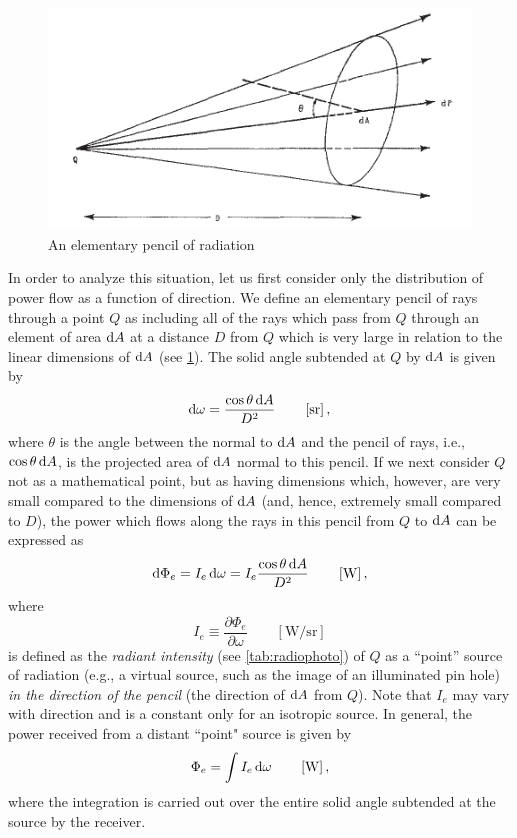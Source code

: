 \begin{refsection}
\begin{figure}
\begin{center}
\includegraphics{figures_built/nicodemus1963-fig1.pdf}
\end{center}
\caption{An elementary pencil of radiation}
\label{fig:nicodemus1}
\end{figure}

In order to analyze this situation, let us first consider only the distribution
of power flow as a function of direction. We define an elementary pencil of rays
through a point $Q$ as including all of the rays which pass from $Q$ through an
element of area $\mathop{}\!\mathrm{d} A$ at a distance $D$ from $Q$ which is very large in relation
to
the linear dimensions of $\mathop{}\!\mathrm{d} A$ (see \cref{fig:nicodemus1}).
The solid angle subtended at $Q$ by $\mathop{}\!\mathrm{d} A$ is given by
\begin{equation*}
\d\omega = \frac{\cos\theta \d A}{D^2}
\qquad \left[\unit{\steradian}\right],
\end{equation*}
where $\theta$ is the angle between the normal to $\mathop{}\!\mathrm{d} A$ and the pencil of rays,
i.e., $\cos\theta \mathop{}\!\mathrm{d} A$, is the projected area of $\mathop{}\!\mathrm{d} A$ normal to this pencil.
If we next consider $Q$ not as a mathematical point, but as having dimensions
which, however, are very small compared to the dimensions of $\mathop{}\!\mathrm{d} A$ (and, hence,
extremely small compared to $D$), the power which flows along the rays in this
pencil from $Q$ to $\mathop{}\!\mathrm{d} A$ can be expressed as
\begin{equation*}
\d\Phi_e = I_e \d\omega = I_e \frac{\cos\theta \d A}{D^2}
\qquad \left[\unit{\watt}\right],
\end{equation*}
where
\begin{equation}
I_e \equiv \frac{\partial \Phi_e}{\partial \omega}
\qquad \left[\unit{\watt\per\steradian}\right]
\end{equation}
is defined as the \textsl{radiant intensity} (see \cref{tab:radiophoto}) of
$Q$ as a “point” source of radiation (e.g., a virtual source, such as the image
of an illuminated pin hole) \emph{in the direction of the pencil} (the direction of
$\mathop{}\!\mathrm{d} A$ from $Q$). Note that $I_e$ may vary with direction and is a constant only
for an isotropic source. In general, the power received from a distant “point"
source is given by
\begin{equation}
\Phi_e = \int I_e \d\omega
\qquad \left[\unit{\watt}\right],
\end{equation}
where the integration is carried out over the entire solid angle subtended at
the source by the receiver.


\end{refsection}
